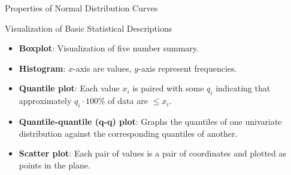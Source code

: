 \begin{frame}{Properties of Normal Distribution Curves}
	\hspace{0.2cm}
\end{frame}

\begin{frame}{Visualization of Basic Statistical Descriptions}
	\begin{itemize}
		\item \textbf{Boxplot}: Visualization of five number summary.
		\item \textbf{Histogram}: $x$-axis are values, $y$-axis represent frequencies.
		\item \textbf{Quantile plot}: Each value $x_i$ is paired with some $q_i$ indicating that approximately $q_i \cdot 100 \%$ of data are $\leq x_i$.
		\item \textbf{Quantile-quantile (q-q) plot}: Graphs the quantiles of one univariate distribution against the corresponding quantiles of another.
		\item \textbf{Scatter plot}: Each pair of values is a pair of coordinates and plotted as points in the plane.
	\end{itemize}
\end{frame}

